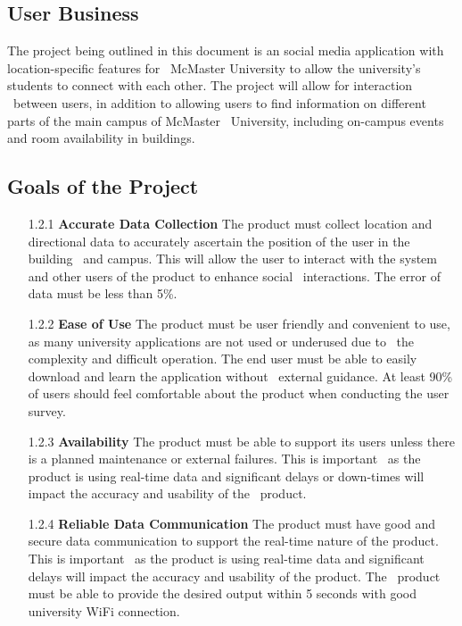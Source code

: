 \documentclass[12pt]{article}
\begin{document}
\subsection{User Business}
\quad The project being outlined in this document is an social media application with location-specific features for \
McMaster University to allow the university's students to connect with each other. The project will allow for interaction \
between users, in addition to allowing users to find information on different parts of the main campus of McMaster \
University, including on-campus events and room availability in buildings.

\subsection{Goals of the Project}
\begin{itemize}
  \item[1.2.1] \textbf{Accurate Data Collection}
  The product must collect location and directional data to accurately ascertain the position of the user in the building \
  and campus. This will allow the user to interact with the system and other users of the product to enhance social \
  interactions. The error of data must be less than 5\%.

  \item[1.2.2] \textbf{Ease of Use}
  The product must be user friendly and convenient to use, as many university applications are not used or underused due to \
  the complexity and difficult operation. The end user must be able to easily download and learn the application without \
  external guidance. At least 90\% of users should feel comfortable about the product when conducting the user survey.

  \item[1.2.3] \textbf{Availability}
  The product must be able to support its users unless there is a planned maintenance or external failures. This is important \
  as the product is using real-time data and significant delays or down-times will impact the accuracy and usability of the \
  product.

  \item[1.2.4] \textbf{Reliable Data Communication}
  The product must have good and secure data communication to support the real-time nature of the product. This is important \
  as the product is using real-time data and significant delays will impact the accuracy and usability of the product. The \
  product must be able to provide the desired output within 5 seconds with good university WiFi connection.


\end{itemize}
\end{document}
